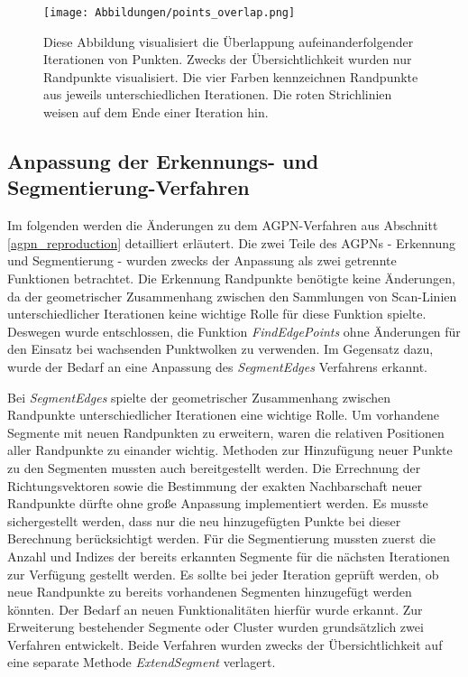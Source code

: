 \begin{figure}[h]
	\texttt{[image: Abbildungen/points\_overlap.png]}
	\centering
	\caption{Diese Abbildung visualisiert die Überlappung aufeinanderfolgender Iterationen von Punkten. Zwecks der Übersichtlichkeit wurden nur Randpunkte visualisiert. Die vier Farben kennzeichnen Randpunkte aus jeweils unterschiedlichen Iterationen. Die roten Strichlinien weisen auf dem Ende einer Iteration hin.}
	\label{fig: point_overlap}
\end{figure}

\subsection{Anpassung der Erkennungs- und Segmentierung-Verfahren}
Im folgenden werden die Änderungen zu dem AGPN-Verfahren aus Abschnitt \ref{agpn_reproduction} detailliert erläutert. Die zwei Teile des AGPNs - Erkennung und Segmentierung - wurden zwecks der Anpassung als zwei getrennte Funktionen betrachtet. Die Erkennung Randpunkte benötigte keine Änderungen, da der geometrischer Zusammenhang zwischen den Sammlungen von Scan-Linien unterschiedlicher Iterationen keine wichtige Rolle für diese Funktion spielte. Deswegen wurde entschlossen, die Funktion \textit{FindEdgePoints} ohne Änderungen für den Einsatz bei wachsenden Punktwolken zu verwenden. Im Gegensatz dazu, wurde der Bedarf an eine Anpassung des \textit{SegmentEdges} Verfahrens erkannt.

Bei \textit{SegmentEdges} spielte der geometrischer Zusammenhang zwischen Randpunkte unterschiedlicher Iterationen eine wichtige Rolle. Um vorhandene Segmente mit neuen Randpunkten zu erweitern, waren die relativen Positionen aller Randpunkte zu einander wichtig. Methoden zur Hinzufügung neuer Punkte zu den Segmenten mussten auch bereitgestellt werden. Die Errechnung der Richtungsvektoren sowie die Bestimmung der exakten Nachbarschaft neuer Randpunkte dürfte ohne große Anpassung implementiert werden. Es musste sichergestellt werden, dass nur die neu hinzugefügten Punkte bei dieser Berechnung berücksichtigt werden. Für die Segmentierung mussten zuerst die Anzahl und Indizes der bereits erkannten Segmente für die nächsten Iterationen zur Verfügung gestellt werden. Es sollte bei jeder Iteration geprüft werden, ob neue Randpunkte zu bereits vorhandenen Segmenten hinzugefügt werden könnten. Der Bedarf an neuen Funktionalitäten hierfür wurde erkannt. Zur Erweiterung bestehender Segmente oder Cluster wurden grundsätzlich zwei Verfahren entwickelt. Beide Verfahren wurden zwecks der Übersichtlichkeit auf eine separate Methode \textit{ExtendSegment} verlagert.

